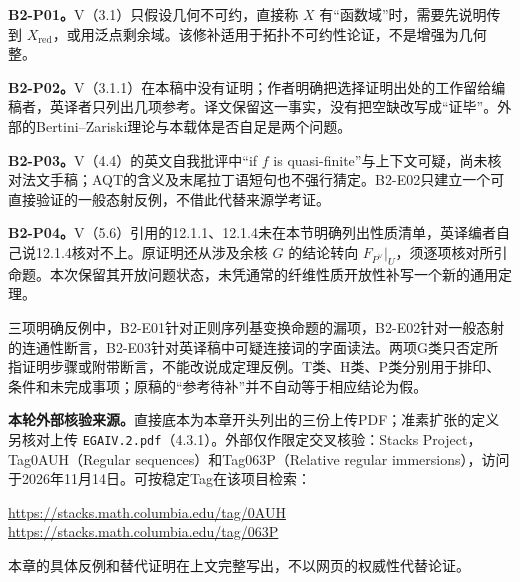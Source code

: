 \textbf{B2-P01。}V（3.1）只假设几何不可约，直接称 $X$ 有“函数域”时，需要先说明传到 $X_{\mathrm{red}}$，或用泛点剩余域。该修补适用于拓扑不可约性论证，不是增强为几何整。

\textbf{B2-P02。}V（3.1.1）在本稿中没有证明；作者明确把选择证明出处的工作留给编稿者，英译者只列出几项参考。译文保留这一事实，没有把空缺改写成“证毕”。外部的Bertini--Zariski理论与本载体是否自足是两个问题。

\textbf{B2-P03。}V（4.4）的英文自我批评中“if $f$ is quasi-finite”与上下文可疑，尚未核对法文手稿；AQT的含义及末尾拉丁语短句也不强行猜定。B2-E02只建立一个可直接验证的一般态射反例，不借此代替来源学考证。

\textbf{B2-P04。}V（5.6）引用的12.1.1、12.1.4未在本节明确列出性质清单，英译编者自己说12.1.4核对不上。原证明还从涉及余核 $G$ 的结论转向 $F_{P^\vee}|_U$，须逐项核对所引命题。本次保留其开放问题状态，未凭通常的纤维性质开放性补写一个新的通用定理。

三项明确反例中，B2-E01针对正则序列基变换命题的漏项，B2-E02针对一般态射的连通性断言，B2-E03针对英译稿中可疑连接词的字面读法。两项G类只否定所指证明步骤或附带断言，不能改说成定理反例。T类、H类、P类分别用于排印、条件和未完成事项；原稿的“参考待补”并不自动等于相应结论为假。

\textbf{本轮外部核验来源。}直接底本为本章开头列出的三份上传PDF；准素扩张的定义另核对上传 \texttt{EGAIV.2.pdf}（4.3.1）。外部仅作限定交叉核验：Stacks Project，Tag0AUH（Regular sequences）和Tag063P（Relative regular immersions），访问于2026年11月14日。可按稳定Tag在该项目检索：
\begin{center}
\url{https://stacks.math.columbia.edu/tag/0AUH}\\
\url{https://stacks.math.columbia.edu/tag/063P}
\end{center}
本章的具体反例和替代证明在上文完整写出，不以网页的权威性代替论证。
\par
